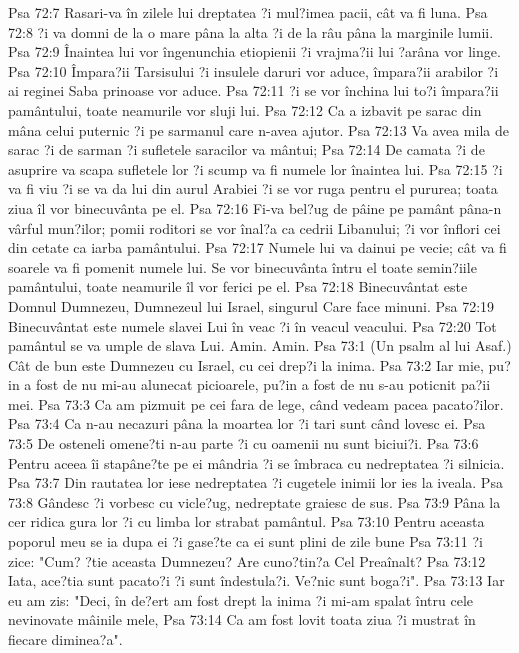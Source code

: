 Psa 72:7  Rasari-va în zilele lui dreptatea ?i mul?imea pacii, cât va fi luna.
Psa 72:8  ?i va domni de la o mare pâna la alta ?i de la râu pâna la marginile lumii.
Psa 72:9  Înaintea lui vor îngenunchia etiopienii ?i vrajma?ii lui ?arâna vor linge.
Psa 72:10  Împara?ii Tarsisului ?i insulele daruri vor aduce, împara?ii arabilor ?i ai reginei Saba prinoase vor aduce.
Psa 72:11  ?i se vor închina lui to?i împara?ii pamântului, toate neamurile vor sluji lui.
Psa 72:12  Ca a izbavit pe sarac din mâna celui puternic ?i pe sarmanul care n-avea ajutor.
Psa 72:13  Va avea mila de sarac ?i de sarman ?i sufletele saracilor va mântui;
Psa 72:14  De camata ?i de asuprire va scapa sufletele lor ?i scump va fi numele lor înaintea lui.
Psa 72:15  ?i va fi viu ?i se va da lui din aurul Arabiei ?i se vor ruga pentru el pururea; toata ziua îl vor binecuvânta pe el.
Psa 72:16  Fi-va bel?ug de pâine pe pamânt pâna-n vârful mun?ilor; pomii roditori se vor înal?a ca cedrii Libanului; ?i vor înflori cei din cetate ca iarba pamântului.
Psa 72:17  Numele lui va dainui pe vecie; cât va fi soarele va fi pomenit numele lui. Se vor binecuvânta întru el toate semin?iile pamântului, toate neamurile îl vor ferici pe el.
Psa 72:18  Binecuvântat este Domnul Dumnezeu, Dumnezeul lui Israel, singurul Care face minuni.
Psa 72:19  Binecuvântat este numele slavei Lui în veac ?i în veacul veacului.
Psa 72:20  Tot pamântul se va umple de slava Lui. Amin. Amin.
Psa 73:1  (Un psalm al lui Asaf.) Cât de bun este Dumnezeu cu Israel, cu cei drep?i la inima.
Psa 73:2  Iar mie, pu?in a fost de nu mi-au alunecat picioarele, pu?in a fost de nu s-au poticnit pa?ii mei.
Psa 73:3  Ca am pizmuit pe cei fara de lege, când vedeam pacea pacato?ilor.
Psa 73:4  Ca n-au necazuri pâna la moartea lor ?i tari sunt când lovesc ei.
Psa 73:5  De osteneli omene?ti n-au parte ?i cu oamenii nu sunt biciui?i.
Psa 73:6  Pentru aceea îi stapâne?te pe ei mândria ?i se îmbraca cu nedreptatea ?i silnicia.
Psa 73:7  Din rautatea lor iese nedreptatea ?i cugetele inimii lor ies la iveala.
Psa 73:8  Gândesc ?i vorbesc cu vicle?ug, nedreptate graiesc de sus.
Psa 73:9  Pâna la cer ridica gura lor ?i cu limba lor strabat pamântul.
Psa 73:10  Pentru aceasta poporul meu se ia dupa ei ?i gase?te ca ei sunt plini de zile bune
Psa 73:11  ?i zice: "Cum? ?tie aceasta Dumnezeu? Are cuno?tin?a Cel Preaînalt?
Psa 73:12  Iata, ace?tia sunt pacato?i ?i sunt îndestula?i. Ve?nic sunt boga?i".
Psa 73:13  Iar eu am zis: "Deci, în de?ert am fost drept la inima ?i mi-am spalat întru cele nevinovate mâinile mele,
Psa 73:14  Ca am fost lovit toata ziua ?i mustrat în fiecare diminea?a".
